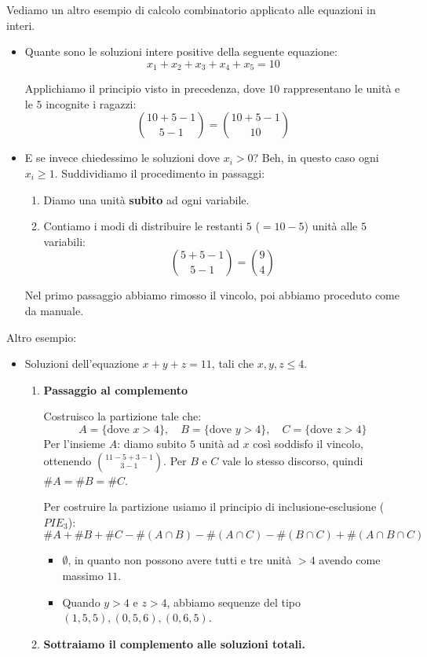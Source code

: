 \documentclass[12pt]{report}
\begin{document}
	Vediamo un altro esempio di calcolo combinatorio applicato alle equazioni in interi.
	
	\begin{itemize}
		\item Quante sono le soluzioni intere positive della seguente equazione:
		\[
		x_1 + x_2 + x_3 + x_4 + x_5 = 10
		\]
		
		Applichiamo il principio visto in precedenza, dove $10$ rappresentano le unità e le $5$ incognite i ragazzi:
		\[
		\binom{10 + 5 - 1}{5 - 1} = \binom{10 + 5 - 1}{10}
		\]
		
		\item E se invece chiedessimo le soluzioni dove $x_i > 0$?
		Beh, in questo caso ogni $x_i \geq 1$. Suddividiamo il procedimento in passaggi:
		\begin{enumerate}
			\item Diamo una unità \textbf{subito} ad ogni variabile.
			\item Contiamo i modi di distribuire le restanti $5$ ($= 10 - 5$) unità alle $5$ variabili:
			\[
			\binom{5 + 5 - 1}{5 - 1} = \binom{9}{4}
			\]
		\end{enumerate}
		Nel primo passaggio abbiamo rimosso il vincolo, poi abbiamo proceduto come da manuale.
	\end{itemize}
	
	Altro esempio:
	\begin{itemize}
		\item Soluzioni dell'equazione $x + y + z = 11$, tali che $x, y, z \leq 4$.
		
		\begin{enumerate}
			\item \textbf{Passaggio al complemento}
			
			Costruisco la partizione tale che:
			\[
			A = \{ \text{dove } x > 4 \}, \quad B = \{ \text{dove } y > 4 \}, \quad C = \{ \text{dove } z > 4 \}
			\]
			Per l'insieme $A$: diamo subito $5$ unità ad $x$ così soddisfo il vincolo, ottenendo $\binom{11 - 5 + 3 - 1}{3 - 1}$.
			Per $B$ e $C$ vale lo stesso discorso, quindi $\#A = \#B = \#C$.
			
			Per costruire la partizione usiamo il principio di inclusione-esclusione ($PIE_3$):
			\[
			\#A + \#B + \#C - \#(A \cap B) - \#(A \cap C) - \#(B \cap C) + \#(A \cap B \cap C)
			\]
			\begin{itemize}
				\item $\emptyset$, in quanto non possono avere tutti e tre unità $> 4$ avendo come massimo $11$.
				\item Quando $y > 4$ e $z > 4$, abbiamo sequenze del tipo $(1, 5, 5), (0, 5, 6), (0, 6, 5)$.
			\end{itemize}
			
			\item \textbf{Sottraiamo il complemento alle soluzioni totali.}
		\end{enumerate}
	\end{itemize}
	
\end{document}
